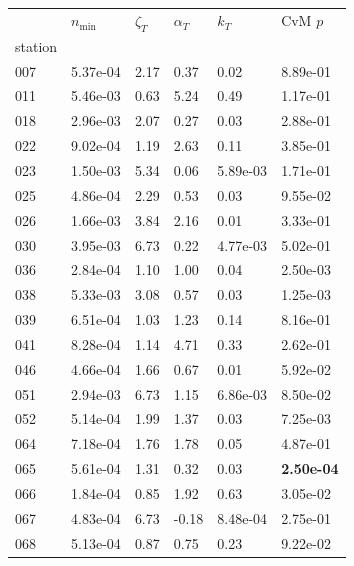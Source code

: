 \begin{figure}[htbp!]
    \centering
    {\footnotesize
    \begin{minipage}[t]{0.48\linewidth}
        \centering
        \begin{tabular}{llllll}
        \toprule
         & $n_{\min}$ & $\zeta_T$ & $\alpha_T$ & $k_T$ & CvM $p$ \\
        station &  &  &  &  &  \\
        \midrule
                    007 & 5.37e-04 & 2.17 & 0.37 & 0.02 & 8.89e-01\\
                    011 & 5.46e-03 & 0.63 & 5.24 & 0.49 & 1.17e-01\\
                    018 & 2.96e-03 & 2.07 & 0.27 & 0.03 & 2.88e-01\\
                    022 & 9.02e-04 & 1.19 & 2.63 & 0.11 & 3.85e-01\\
                    023 & 1.50e-03 & 5.34 & 0.06 & 5.89e-03 & 1.71e-01\\
                    025 & 4.86e-04 & 2.29 & 0.53 & 0.03 & 9.55e-02\\
                    026 & 1.66e-03 & 3.84 & 2.16 & 0.01 & 3.33e-01\\
                    030 & 3.95e-03 & 6.73 & 0.22 & 4.77e-03 & 5.02e-01\\
                    036 & 2.84e-04 & 1.10 & 1.00 & 0.04 & 2.50e-03\\
                    038 & 5.33e-03 & 3.08 & 0.57 & 0.03 & 1.25e-03\\
                    039 & 6.51e-04 & 1.03 & 1.23 & 0.14 & 8.16e-01\\
                    041 & 8.28e-04 & 1.14 & 4.71 & 0.33 & 2.62e-01\\
                    046 & 4.66e-04 & 1.66 & 0.67 & 0.01 & 5.92e-02\\
                    051 & 2.94e-03 & 6.73 & 1.15 & 6.86e-03 & 8.50e-02\\
                    052 & 5.14e-04 & 1.99 & 1.37 & 0.03 & 7.25e-03\\
                    064 & 7.18e-04 & 1.76 & 1.78 & 0.05 & 4.87e-01\\
                    065 & 5.61e-04 & 1.31 & 0.32 & 0.03 & \textbf{2.50e-04}\\
                    066 & 1.84e-04 & 0.85 & 1.92 & 0.63 & 3.05e-02\\
                    067 & 4.83e-04 & 6.73 & -0.18 & 8.48e-04 & 2.75e-01\\
                    068 & 5.13e-04 & 0.87 & 0.75 & 0.23 & 9.22e-02\\

\end{tabular}
\end{minipage}}
\end{figure}
